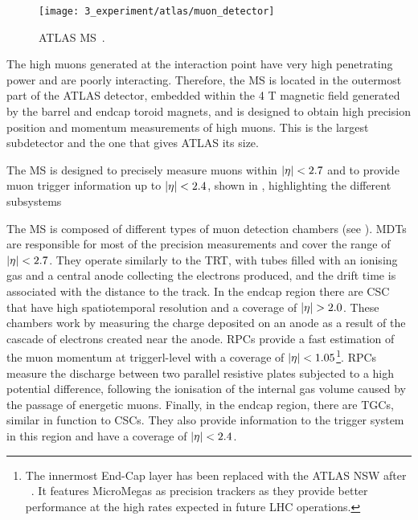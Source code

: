 \begin{figure}[ht!]
    \centering
    \texttt{[image: 3\_experiment/atlas/muon\_detector]}
    \caption{\ac{ATLAS} \acf{MS}~\cite{AtlasExperiment}.}
    \label{fig:atlas:atlas:muon_spectrometer:muon_spectrometer}
\end{figure}

The high \pt muons generated at the interaction point have very high penetrating power and are poorly interacting. Therefore, the \ac{MS} \cite{MuonTDR} is located in the outermost part of the \ac{ATLAS} detector, embedded within the 4 T magnetic field generated by the barrel and endcap toroid magnets, and is designed to obtain high precision position and momentum measurements of high \pt muons. This is the largest subdetector and the one that gives \ac{ATLAS} its size.

The \ac{MS} is designed to precisely measure muons within \(|\eta|<2.7\) and to provide muon trigger information up to \(|\eta|<2.4\), shown in \Fig{\ref{fig:atlas:atlas:muon_spectrometer:muon_spectrometer}}, highlighting the different subsystems

The \ac{MS} is composed of different types of muon detection chambers (see \Fig{\ref{fig:atlas:atlas:muon_spectrometer:muon_spectrometer}}). \acp{MDT} are responsible for most of the precision measurements and cover the range of \(|\eta|<2.7\). They operate similarly to the \ac{TRT}, with tubes filled with an ionising gas and a central anode collecting the electrons produced, and the drift time is associated with the distance to the track. In the endcap region there are \ac{CSC} that have high spatiotemporal resolution and a coverage of \(\abseta>2.0\). These chambers work by measuring the charge deposited on an anode as a result of the cascade of electrons created near the anode. \acp{RPC} provide a fast estimation of the muon momentum at triggerl-level with a coverage of \(|\eta|<1.05\)\footnote{The innermost End-Cap layer has been replaced with the \ac{ATLAS} \ac{NSW} after \RunTwo~\cite{NSW}. It features MicroMegas as precision trackers as they provide better performance at the high rates expected in future LHC operations.}. \acp{RPC} measure the discharge between two parallel resistive plates subjected to a high potential difference, following the ionisation of the internal gas volume caused by the passage of energetic muons. Finally, in the endcap region, there are \acp{TGC}, similar in function to \acp{CSC}. They also provide information to the trigger system in this region and have a coverage of \(|\eta|<2.4\).

